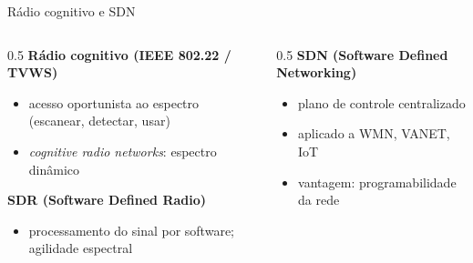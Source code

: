 \documentclass[aspectratio=169,11pt]{beamer}
\begin{document}
\begin{frame}{Rádio cognitivo e SDN}
  \begin{columns}
    \begin{column}{0.5\textwidth}
      \textbf{Rádio cognitivo (IEEE 802.22 / TVWS)}
      \begin{itemize}
        \item acesso oportunista ao espectro (escanear, detectar, usar)
        \item \emph{cognitive radio networks}: espectro dinâmico
      \end{itemize}
      \textbf{SDR (Software Defined Radio)}
      \begin{itemize}
        \item processamento do sinal por software; agilidade espectral
      \end{itemize}
    \end{column}
    \begin{column}{0.5\textwidth}
      \textbf{SDN (Software Defined Networking)}
      \begin{itemize}
        \item plano de controle centralizado
        \item aplicado a WMN, VANET, IoT
        \item vantagem: programabilidade da rede
      \end{itemize}
    \end{column}
  \end{columns}
\end{frame}
\end{document}
